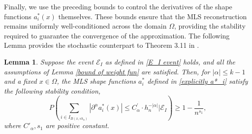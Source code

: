 \documentclass{article}
\newtheorem{lemma}{Lemma}
\begin{document}
Finally, we use the preceding bounds to control the derivatives of the shape functions $a_i^*(x)$ themselves. These bounds ensure that the MLS reconstruction remains uniformly well-conditioned across the domain $\Omega$, providing the stability required to guarantee the convergence of the approximation. 
The following Lemma provides the stochastic counterpart to Theorem 3.11 in \cite{mirzaei2015analysis}.

\begin{lemma}
Suppose the event $\mathscr{E}_I$ as defined in \eqref{E_I event} holds, and all the assumptions of Lemma \ref{bound of weight fun} are satisfied. Then, for $|\alpha|\leq k-1$ and a fixed $x\in \Omega$, the MLS shape functions $a^*_i$ defined in \eqref{explicitly a*_i} satisfy the following stability condition,
\begin{equation}
    P\left(\sum_{i \in I_{B\left(x, s h_n\right)}}\left|\partial^\alpha a_i^*(x)\right| \leq C_\alpha^{\prime} \cdot h_n^{-|\alpha|} \Big|\mathscr{E}_I\right)\geq 1-\frac{1}{n^{s_1}},
\end{equation}
where $C'_\alpha,s_1$ are positive constant.
\label{lemma 3.11 davoud-bound shape function}
\end{lemma}
\end{document}
